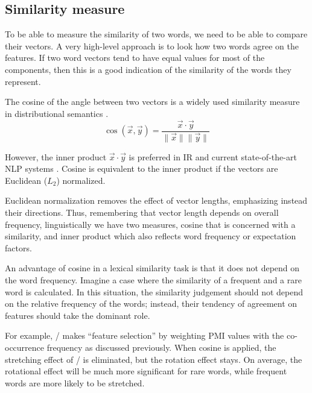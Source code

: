 \subsection{Similarity measure}
\label{sec:similarity-measure}

To be able to measure the similarity of two words, we need to be able to compare their vectors. A very high-level approach is to look how two words agree on the features. If two word vectors tend to have equal values for most of the components, then this is a good indication of the similarity of the words they represent.

The cosine of the angle between two vectors is a widely used similarity measure in distributional semantics \cite{Turney:2010:FMV:1861751.1861756,lapesa2014large}.
%
\begin{equation*}
  \label{eq:cos}
  \cos(\vec{x}, \vec{y}) = \frac{\vec{x} \cdot \vec{y}}
                                {\|\vec{x}\| \|\vec{y}\|}
\end{equation*}

However, the inner product $\vec{x} \cdot \vec{y}$ is preferred in IR and current state-of-the-art NLP systems \cite{mikolov2013distributed,mikolov2013linguistic,TACL570}. Cosine is equivalent to the inner product if the vectors are Euclidean ($L_2$) normalized.

Euclidean normalization removes the effect of vector lengths, emphasizing instead their directions. Thus, remembering that vector length depends on overall frequency, linguistically we have two measures, cosine that is concerned with a similarity, and inner product which also reflects word frequency or expectation factors.

An advantage of cosine in a lexical similarity task is that it does not depend on the word frequency. Imagine a case where the similarity of a frequent and a rare word is calculated. In this situation, the similarity judgement should not depend on the relative frequency of the words; instead, their tendency of agreement on features should take the dominant role.

For example, \NPMI/ makes ``feature selection'' by weighting PMI values with the co-occurrence frequency as discussed previously. When cosine is applied, the stretching effect of \NPMI/ is eliminated, but the rotation effect stays. On average, the rotational effect will be much more significant for rare words, while frequent words are more likely to be stretched.


